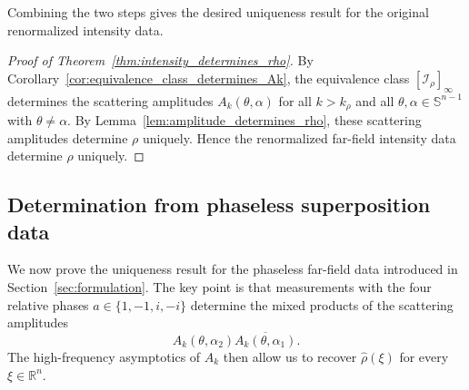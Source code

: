 \documentclass[12pt,a4paper]{amsart}
\numberwithin{equation}{section}
\theoremstyle{plain}
\theoremstyle{definition}
\begin{document}
Combining the two steps gives the desired uniqueness result for the original renormalized intensity data.

\begin{proof}[Proof of Theorem~\ref{thm:intensity_determines_rho}]
By Corollary~\ref{cor:equivalence_class_determines_Ak}, the equivalence class
$[\mathcal I_\rho]_\infty$ determines the scattering amplitudes
$A_k(\theta,\alpha)$ for all $k>k_\rho$ and all
$\theta,\alpha\in\mathbb S^{n-1}$ with $\theta\ne\alpha$.
By Lemma~\ref{lem:amplitude_determines_rho}, these scattering amplitudes
determine $\rho$ uniquely. Hence the renormalized far-field intensity data
determine $\rho$ uniquely.
\end{proof}

\subsection{Determination from phaseless superposition data}
We now prove the uniqueness result for the phaseless far-field data introduced
in Section~\ref{sec:formulation}. The key point is that measurements with
the four relative phases $a\in\{1,-1,i,-i\}$ determine the mixed products
of the scattering amplitudes
\begin{equation*}
    A_k(\theta,\alpha_2)\overline{A_k(\theta,\alpha_1)}.
\end{equation*}
The high-frequency asymptotics of $A_k$ then allow us to recover
$\widehat\rho(\xi)$ for every $\xi\in\mathbb R^n$.
\end{document}
